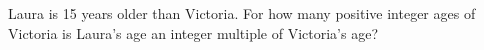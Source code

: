 Laura is 15 years older than Victoria. For how many positive integer ages of Victoria is Laura's age an integer multiple of Victoria's age?
